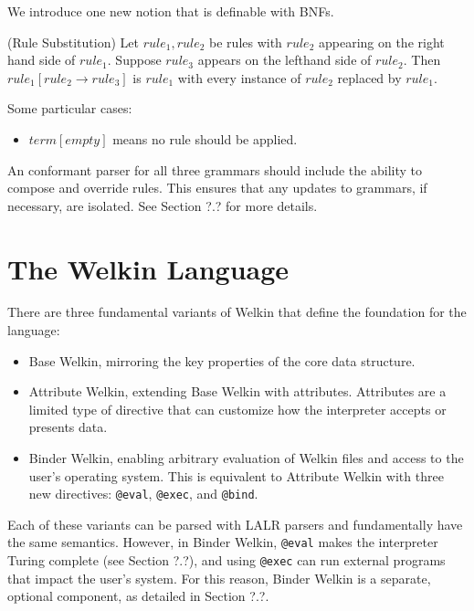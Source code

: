 We introduce one new notion that is definable with BNFs.
\begin{definition} (Rule Substitution) Let $rule_{1}, rule_{2}$ be rules with $rule_{2}$ appearing on the right hand side of $rule_{1}.$ Suppose $rule_{3}$ appears on the lefthand side of $rule_{2}.$ Then $rule_{1}[rule_{2}\to rule_{3}]$ is $rule_{1}$ with every instance of $rule_{2}$ replaced by $rule_{1}.$

Some particular cases:
\begin{itemize}
\item $term[empty]$ means no rule should be applied.
\end{itemize}

\end{definition}

An conformant parser for all three grammars should include the ability to compose and override rules. This ensures that any updates to grammars, if necessary, are isolated. See Section ?.? for more details.
%
\section{The Welkin Language}

There are three fundamental variants of Welkin that define the foundation for the language:
\begin{itemize}
	\item Base Welkin, mirroring the key properties of the core data structure.
	\item Attribute Welkin, extending Base Welkin with attributes. Attributes are a limited type of directive that can customize how the interpreter accepts or presents data.
	\item Binder Welkin, enabling arbitrary evaluation of Welkin files and access to the user's operating system. This is equivalent to Attribute Welkin with three new directives: \texttt{@eval}, \texttt{@exec}, and \texttt{@bind}. \end{itemize}
Each of these variants can be parsed with LALR parsers and fundamentally have the same semantics. However, in Binder Welkin, \texttt{@eval} makes the interpreter Turing complete (see Section ?.?), and using \texttt{@exec} can run external programs that impact the user's system. For this reason, Binder Welkin is a separate, optional component, as detailed in Section ?.?.

